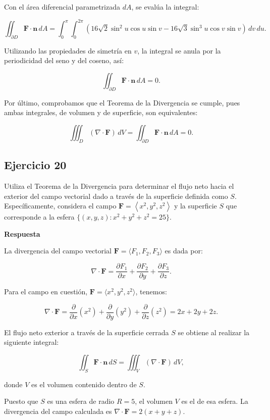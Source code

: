\documentclass{report}
\begin{document}
Con el área diferencial parametrizada \( dA \), se evalúa la integral:

\[
\iint_{\partial D} \mathbf{F} \cdot \mathbf{n} \, dA = \int_0^{\pi} \int_0^{2\pi} \left( 16\sqrt{2} \sin^2 u \cos u \sin v - 16\sqrt{3} \sin^3 u \cos v \sin v \right) \, dv \, du.
\]

Utilizando las propiedades de simetría en \( v \), la integral se anula por la periodicidad del seno y del coseno, así:

\[
\iint_{\partial D} \mathbf{F} \cdot \mathbf{n} \, dA = 0.
\]

Por último, comprobamos que el Teorema de la Divergencia se cumple, pues ambas integrales, de volumen y de superficie, son equivalentes:

\[
\iiint_D (\nabla \cdot \mathbf{F}) \, dV = \iint_{\partial D} \mathbf{F} \cdot \mathbf{n} \, dA = 0.
\]

\subsection*{Ejercicio 20}
Utiliza el Teorema de la Divergencia para determinar el flujo neto hacia el exterior del campo vectorial dado a través de la superficie definida como \( S \). Específicamente, considera el campo \(\mathbf{F}=\left\langle x^2, y^2, z^2\right\rangle\) y la superficie \( S \) que corresponde a la esfera \(\{(x, y, z): x^2+y^2+z^2=25\}\).

\textbf{Respuesta}

La divergencia del campo vectorial \( \mathbf{F} = \langle F_1, F_2, F_3 \rangle \) es dada por:

\[
\nabla \cdot \mathbf{F} = \frac{\partial F_1}{\partial x} + \frac{\partial F_2}{\partial y} + \frac{\partial F_3}{\partial z}.
\]

Para el campo en cuestión, \(\mathbf{F} = \langle x^2, y^2, z^2 \rangle\), tenemos:

\[
\nabla \cdot \mathbf{F} = \frac{\partial}{\partial x}(x^2) + \frac{\partial}{\partial y}(y^2) + \frac{\partial}{\partial z}(z^2) = 2x + 2y + 2z.
\]


El flujo neto exterior a través de la superficie cerrada \( S \) se obtiene al realizar la siguiente integral:

\[
\iint_S \mathbf{F} \cdot \mathbf{n} \, dS = \iiint_V (\nabla \cdot \mathbf{F}) \, dV,
\]

donde \( V \) es el volumen contenido dentro de \( S \).

Puesto que \( S \) es una esfera de radio \( R = 5 \), el volumen \( V \) es el de esa esfera. La divergencia del campo calculada es \( \nabla \cdot \mathbf{F} = 2(x + y + z) \).
\end{document}
